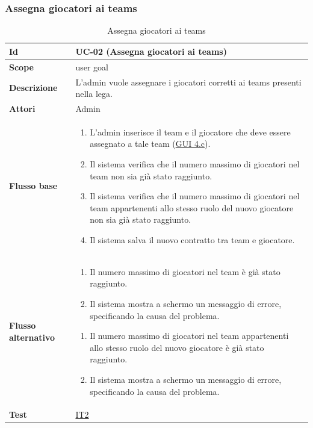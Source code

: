 \subsubsection{Assegna giocatori ai teams}
\begin{table}[H]
\caption{Assegna giocatori ai teams}
\label{UC-02}

\begin{tabularx}{\textwidth}{|l|X|}
\hline
\textbf{Id} & UC-02 (Assegna giocatori ai teams) \\
\hline
\textbf{Scope} & user goal \\
\hline
\textbf{Descrizione} & L'admin vuole assegnare i giocatori corretti ai teams presenti nella lega. \\
\hline
\textbf{Attori} & Admin \\
\hline
\textbf{Flusso base} &
\begin{enumerate}[leftmargin=*]
    \item L'admin inserisce il team e il giocatore che deve essere assegnato a tale team (\hyperref[fig:mockup_parte4]{GUI 4.c}).
    \item Il sistema verifica che il numero massimo di giocatori nel team non sia già stato raggiunto.
    \item Il sistema verifica che il numero massimo di giocatori nel team appartenenti allo 
            stesso ruolo del nuovo giocatore non sia già stato raggiunto.
    \item Il sistema salva il nuovo contratto tra team e giocatore.
\end{enumerate} \\
\hline
\textbf{Flusso alternativo} &
\begin{enumerate}[leftmargin=*,label=2.\arabic*]
    \item Il numero massimo di giocatori nel team è già stato raggiunto.
    \item Il sistema mostra a schermo un messaggio di errore, specificando la causa del problema.
\end{enumerate}
\begin{enumerate}[leftmargin=*,label=3.\arabic*]
    \item Il numero massimo di giocatori nel team appartenenti allo stesso ruolo
            del nuovo giocatore è già stato raggiunto.
    \item Il sistema mostra a schermo un messaggio di errore, specificando la causa del problema.
\end{enumerate} \\
\hline
\textbf{Test} & \hyperref[IT2]{IT2} \\
\hline
\end{tabularx}

\end{table}


